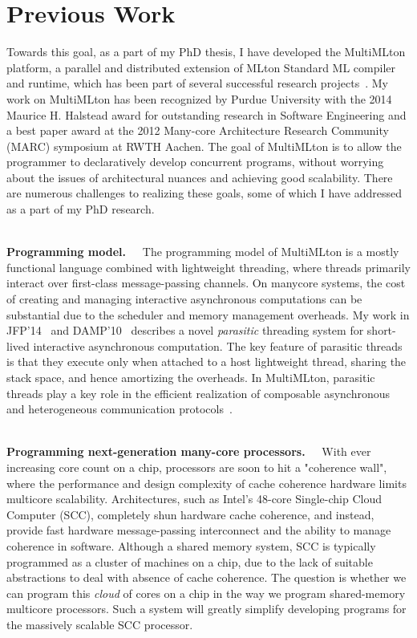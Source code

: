 \documentclass[screen,acmsmall,nonacm]{acmart}
\newcommand{\R}[1]{~\\[-2mm] \noindent \textbf{#1.~~}}
\begin{document}
\section*{Previous Work}

Towards this goal, as a part of my PhD thesis, I have developed the MultiMLton
platform, a parallel and distributed extension of MLton Standard ML compiler
and runtime, which has been part of several successful research
projects~\cite{mmpar, mmgc, KC_MARC12, Ziarek11, Ziarek_ICFP09, isolates,
MMJFP}. My work on MultiMLton has been recognized by Purdue University with the
2014 Maurice H. Halstead award for outstanding research in Software Engineering
and a best paper award at the 2012 Many-core Architecture Research Community
(MARC) symposium at RWTH Aachen. The goal of MultiMLton is to allow the
programmer to declaratively develop concurrent programs, without worrying about
the issues of architectural nuances and achieving good scalability. There are
numerous challenges to realizing these goals, some of which I have addressed as
a part of my PhD research.

\R{Programming model} The programming model of MultiMLton
is a mostly functional language combined with lightweight threading, where
threads primarily interact over first-class message-passing channels. On
manycore systems, the cost of creating and managing interactive asynchronous
computations can be substantial due to the scheduler and memory management
overheads. My work in JFP'14~\cite{MMJFP} and DAMP'10~\cite{mmpar} describes a
novel \emph{parasitic} threading system for short-lived interactive
asynchronous computation. The key feature of parasitic threads is that they
execute only when attached to a host lightweight thread, sharing the stack
space, and hence amortizing the overheads. In MultiMLton, parasitic threads
play a key role in the efficient realization of composable asynchronous and
heterogeneous communication protocols~\cite{Ziarek11}.

\R{Programming next-generation many-core processors} With ever increasing core
count on a chip, processors are soon to hit a "coherence wall", where the
performance and design complexity of cache coherence hardware limits multicore
scalability. Architectures, such as Intel's 48-core Single-chip Cloud Computer
(SCC), completely shun hardware cache coherence, and instead, provide fast
hardware message-passing interconnect and the ability to manage coherence in
software. Although a shared memory system, SCC is typically programmed as a
cluster of machines on a chip, due to the lack of suitable abstractions to deal
with absence of cache coherence. The question is whether we can program this
\emph{cloud} of cores on a chip in the way we program shared-memory multicore
processors. Such a system will greatly simplify developing programs for the
massively scalable SCC processor.
\end{document}
